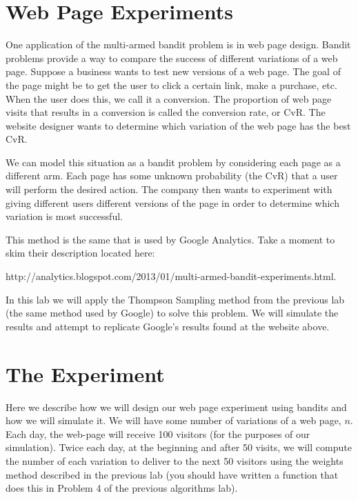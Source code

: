 
\section*{Web Page Experiments}
One application of the multi-armed bandit problem is in web page design.  Bandit problems provide a way to compare the success of different variations of a web page.  Suppose a business wants to test new versions of a web page.  The goal of the page might be to get the user to click a certain link, make a purchase, etc.  When the user does this, we call it a conversion.  The proportion of web page visits that results in a conversion is called the conversion rate, or CvR.  The website designer wants to determine which variation of the web page has the best CvR.

We can model this situation as a bandit problem by considering each page as a different arm.  Each page has some unknown probability (the CvR) that a  user will perform the desired action.  The company then wants to experiment with giving different users different versions of the page in order to determine which variation is most successful.

This method is the same that is used by Google Analytics.  Take a moment to skim their description located here:

\begin{center} http://analytics.blogspot.com/2013/01/multi-armed-bandit-experiments.html.
\end{center}

In this lab we will apply the Thompson Sampling method from the previous lab (the same method used by Google) to solve this problem.  We will simulate the results and attempt to replicate Google's results found at the website above.

\section*{The Experiment}
Here we describe how we will design our web page experiment using bandits and how we will simulate it.  We will have some number of variations of a web page, $n$.  Each day, the web-page will receive 100 visitors (for the purposes of our simulation).  Twice each day, at the beginning and after 50 visits, we will compute the number of each variation to deliver to the next 50 visitors using the weights method described in the previous lab (you should have written a function that does this in Problem 4 of the previous algorithms lab).

